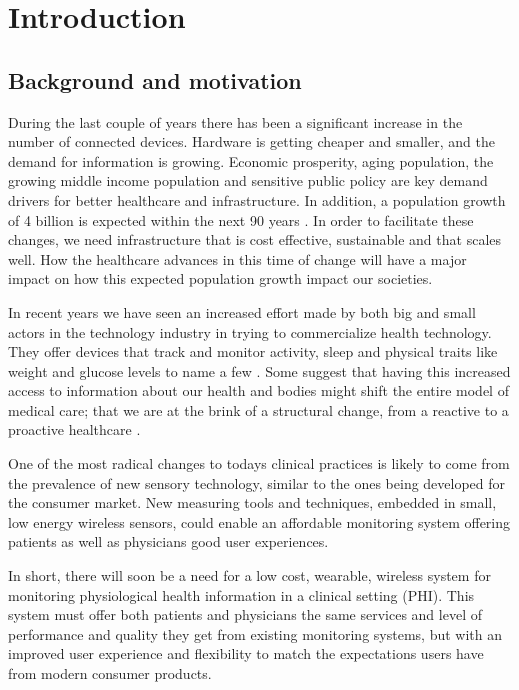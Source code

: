 \section{Introduction} 

\label{sec:introduction}

\subsection{Background and motivation} 

\label{sub:background_and_motivation}

During the last couple of years there has been a significant increase in the number of connected devices. Hardware is getting cheaper and smaller, and the demand for information is growing. Economic prosperity, aging population, the growing middle income population and sensitive public policy are key demand drivers for better healthcare and infrastructure. In addition, a population growth of 4 billion is expected within the next 90 years \cite{WPP2015:Methodology}. In order to facilitate these changes, we need infrastructure that is cost effective, sustainable and that scales well. How the healthcare advances in this time of change will have a major impact on how this expected population growth impact our societies. 

In recent years we have seen an increased effort made by both big and small actors in the technology industry in trying to commercialize health technology. They offer devices that track and monitor activity, sleep and physical traits like weight and glucose levels to name a few \cite{fitbit, fitbit:scale:6}. Some suggest that having this increased access to information about our health and bodies might shift the entire model of medical care; that we are at the brink of a structural change, from a reactive to a proactive healthcare \cite{helsit:kari:8, johnmaeda:9, deloitte:healthcare3:0:10}.

One of the most radical changes to todays clinical practices is likely to come from the prevalence of new sensory technology, similar to the ones being developed for the consumer market. New measuring tools and techniques, embedded in small, low energy wireless sensors, could enable an affordable monitoring system offering patients as well as physicians good user experiences.


In short, there will soon be a need for a low cost, wearable, wireless system for monitoring physiological health information in a clinical setting (PHI). This system must offer both patients and physicians the same services and level of performance and quality they get from existing monitoring systems, but with an improved user experience and flexibility to match the expectations users have from modern consumer products. 

